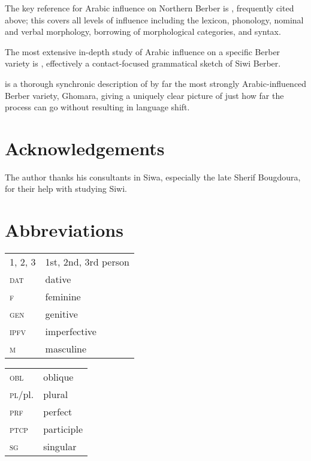 \documentclass[output=paper]{langsci/langscibook}
\begin{document}
The key reference for Arabic influence on Northern Berber is \citet{Kossmann2012}, frequently cited above; this covers all levels of influence including the lexicon, phonology, nominal and verbal morphology, borrowing of morphological categories, and syntax.

The most extensive in-depth study of Arabic influence on a specific Berber variety is \citet{Souag2013book}, effectively a contact-focused grammatical sketch of Siwi Berber.

\citet{Mourigh2016} is a thorough synchronic description of by far the most strongly Arabic-influenced Berber variety, Ghomara, giving a uniquely clear picture of just how far the process can go without resulting in language shift.

\section*{Acknowledgements}

The author thanks his consultants in Siwa, especially the late Sherif Bougdoura, for their help with studying Siwi.

\section*{Abbreviations}
\begin{tabularx}{.45\textwidth}{lQ}
\textsc{1, 2, 3} & 1st, 2nd, 3rd person \\
\textsc{dat} & dative \\
\textsc{f} & feminine \\
\textsc{gen} & genitive \\
\textsc{ipfv} & imperfective  \\
\textsc{m} & masculine \\
\end{tabularx}
\begin{tabularx}{.45\textwidth}{lQ}

\textsc{obl} & oblique \\
\textsc{pl}/pl. & plural \\
\textsc{prf} & perfect \\
\textsc{ptcp} & participle \\
\textsc{sg} & singular \\
\end{tabularx}
 

\sloppy
\printbibliography[heading=subbibliography,notkeyword=this]
\end{document}
